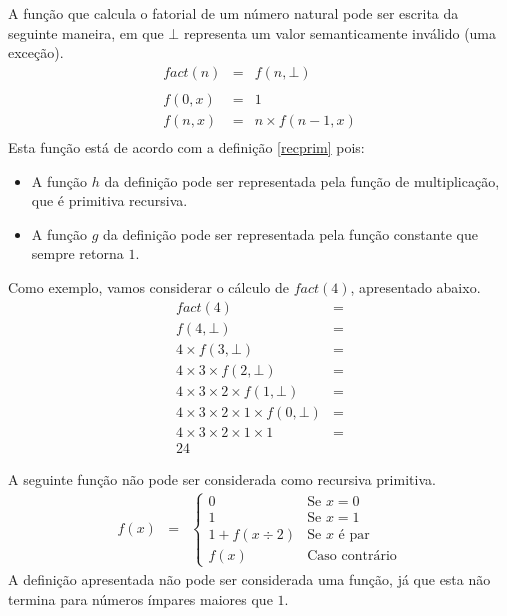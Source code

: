 \begin{Example}
A função que calcula o fatorial de um número natural pode ser escrita
da seguinte maneira, em que $\bot$ representa um valor semanticamente
inválido (uma exceção).
\[
\begin{array}{lcl}
fact(n) &= & f(n,\bot) \\
 & & \\
f(0,x) & = & 1 \\
f(n,x) & = & n \times f (n - 1,x)\\
\end{array}
\]
Esta função está de acordo com a definição \ref{recprim} pois:

\begin{itemize}
    \item A função $h$ da definição pode ser representada pela função
      de multiplicação, que é primitiva recursiva.
    \item A função $g$ da definição pode ser representada pela função
      constante que sempre retorna $1$.
\end{itemize}

Como exemplo, vamos considerar o cálculo de $fact(4)$, apresentado
abaixo.
\[
\begin{array}{lc}
fact(4) & = \\
f(4,\bot) & = \\
4 \times f(3,\bot) & = \\
4 \times 3 \times f(2,\bot) & = \\
4 \times 3 \times 2 \times f(1,\bot) & =\\
4 \times 3 \times 2 \times 1 \times f(0,\bot) & = \\
4 \times 3 \times 2 \times 1 \times 1 & =\\
24
\end{array}
\]
\end{Example}
\begin{Example}
A seguinte função não pode ser considerada como recursiva primitiva.
\[
\begin{array}{lcl}
f(x) & = & \left\{
                    \begin{array}{ll}
                      0 & \text{Se $x = 0$}\\
                      1 & \text{Se $x = 1$}\\
                      1 + f(x \div 2) & \text{Se $x$ é par}\\
                      f(x) & \text{Caso contrário}
                    \end{array}
                \right.
\end{array}
\]
A definição apresentada não pode ser considerada uma função, já que
esta não termina para números ímpares maiores que $1$.
\end{Example}

